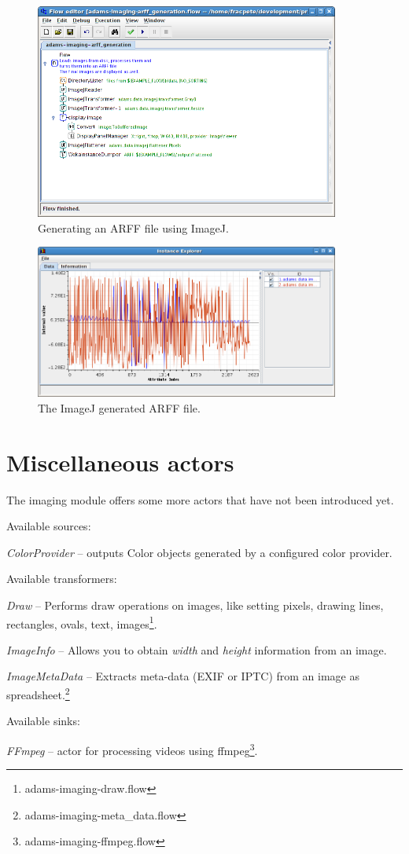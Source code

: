 \documentclass[a4paper]{book}
\begin{document}
\begin{figure}[htb]
  \centering
  \includegraphics[width=10.0cm]{images/imagej-arff-generation-flow.png}
  \caption{Generating an ARFF file using ImageJ.}
  \label{imagej-arff-generation-flow}
\end{figure}

\begin{figure}[htb]
  \centering
  \includegraphics[width=10.0cm]{images/imagej-arff-generation-dataset.png}
  \caption{The ImageJ generated ARFF file.}
  \label{imagej-arff-generation-dataset}
\end{figure}


\chapter{Miscellaneous actors}
The imaging module offers some more actors that have not been introduced yet.

\noindent Available sources:
\begin{tight_itemize}
	\item \textit{ColorProvider} -- outputs Color objects generated by a 
	configured color provider.
\end{tight_itemize}

\noindent Available transformers:
\begin{tight_itemize}
	\item \textit{Draw} -- Performs draw operations on images, like setting 
	pixels, drawing lines, rectangles, ovals, text, images\footnote{adams-imaging-draw.flow}.
	\item \textit{ImageInfo} -- Allows you to obtain \textit{width} and
	\textit{height} information from an image.
	\item \textit{ImageMetaData} -- Extracts meta-data (EXIF or IPTC) from an
	image as spreadsheet.\footnote{adams-imaging-meta\_data.flow}
\end{tight_itemize}

\noindent Available sinks:
\begin{tight_itemize}
  \item \textit{FFmpeg} -- actor for processing videos using
  ffmpeg\cite{ffmpeg}\footnote{adams-imaging-ffmpeg.flow}.
\end{tight_itemize}



\end{document}
